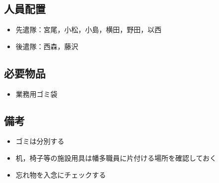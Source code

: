 \subsection{人員配置}
\begin{itemize}
\item 先遣隊：宮尾，小松，小島，横田，野田，以西
\item 後遣隊：西森，藤沢
\end{itemize}



\subsection{必要物品}
\begin{itemize}
\item 業務用ゴミ袋
\end{itemize}


\subsection{備考}
\begin{itemize}
\item ゴミは分別する
\item 机，椅子等の施設用具は幡多職員に片付ける場所を確認しておく
\item 忘れ物を入念にチェックする
\end{itemize}


%

